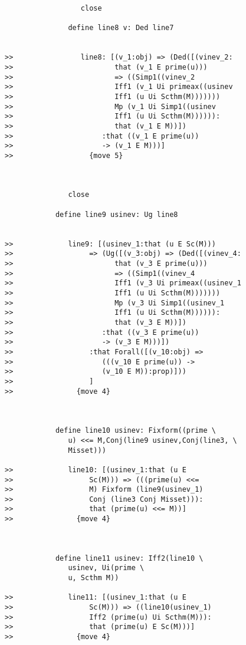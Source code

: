 \documentclass[12pt]{article}
\begin{document}
\begin{verbatim}
                  close

               define line8 v: Ded line7


>>                line8: [(v_1:obj) => (Ded([(vinev_2:
>>                        that (v_1 E prime(u)))
>>                        => ((Simp1((vinev_2
>>                        Iff1 (v_1 Ui primeax((usinev
>>                        Iff1 (u Ui Scthm(M)))))))
>>                        Mp (v_1 Ui Simp1((usinev
>>                        Iff1 (u Ui Scthm(M)))))):
>>                        that (v_1 E M))])
>>                     :that ((v_1 E prime(u))
>>                     -> (v_1 E M)))]
>>                  {move 5}



               close

            define line9 usinev: Ug line8


>>             line9: [(usinev_1:that (u E Sc(M)))
>>                  => (Ug([(v_3:obj) => (Ded([(vinev_4:
>>                        that (v_3 E prime(u)))
>>                        => ((Simp1((vinev_4
>>                        Iff1 (v_3 Ui primeax((usinev_1
>>                        Iff1 (u Ui Scthm(M)))))))
>>                        Mp (v_3 Ui Simp1((usinev_1
>>                        Iff1 (u Ui Scthm(M)))))):
>>                        that (v_3 E M))])
>>                     :that ((v_3 E prime(u))
>>                     -> (v_3 E M)))])
>>                  :that Forall([(v_10:obj) =>
>>                     (((v_10 E prime(u)) ->
>>                     (v_10 E M)):prop)]))
>>                  ]
>>               {move 4}



            define line10 usinev: Fixform((prime \
               u) <<= M,Conj(line9 usinev,Conj(line3, \
               Misset)))

>>             line10: [(usinev_1:that (u E
>>                  Sc(M))) => (((prime(u) <<=
>>                  M) Fixform (line9(usinev_1)
>>                  Conj (line3 Conj Misset))):
>>                  that (prime(u) <<= M))]
>>               {move 4}



            define line11 usinev: Iff2(line10 \
               usinev, Ui(prime \
               u, Scthm M))

>>             line11: [(usinev_1:that (u E
>>                  Sc(M))) => ((line10(usinev_1)
>>                  Iff2 (prime(u) Ui Scthm(M))):
>>                  that (prime(u) E Sc(M)))]
>>               {move 4}




\end{verbatim}
\end{document}
